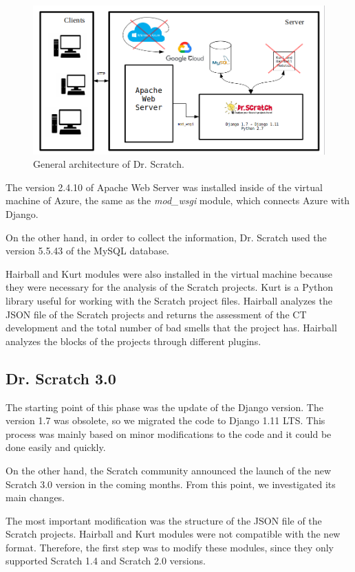  \begin{figure}
    \centering
    \includegraphics[width=12cm,                         keepaspectratio]{img/Client_Server.png}
    \caption{General architecture of Dr. Scratch.}
    \label{fig:architecture}
\end{figure}

The version 2.4.10 of Apache Web Server was installed inside of the virtual machine of Azure, the same as the \textit{mod\_wsgi} module, which connects Azure with Django.

On the other hand, in order to collect the information, Dr. Scratch used the version 5.5.43 of the MySQL database. 

Hairball and Kurt modules were also installed in the virtual machine because they were necessary for the analysis of the Scratch projects. Kurt is a Python library useful for working with the Scratch project files. Hairball analyzes the JSON file of the Scratch projects and returns the assessment of the CT development and the total number of bad smells that the project has. Hairball analyzes the blocks of the projects through different plugins.


\subsection{Dr. Scratch 3.0}
\label{subsec:newversion}

The starting point of this phase was the update of the Django version. The version 1.7 was obsolete, so we migrated the code to Django 1.11 LTS. This process was mainly based on minor modifications to the code and it could be done easily and quickly.

On the other hand, the Scratch community announced the launch of the new Scratch 3.0 version in the coming months. From this point, we investigated its main changes. 

The most important modification was the structure of the JSON file of the Scratch projects. Hairball and Kurt modules were not compatible with the new format. Therefore, the first step was to modify these modules, since they only supported Scratch 1.4 and Scratch 2.0 versions. 

